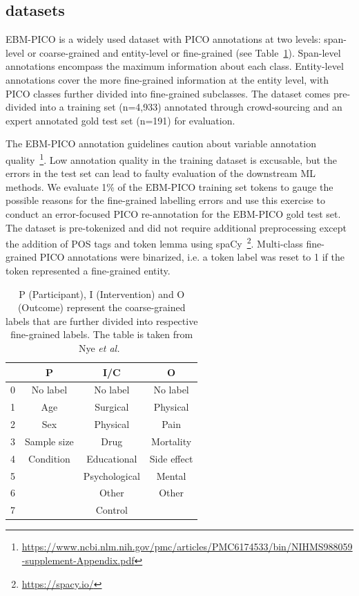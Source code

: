 \documentclass[10.7pt,]{article}
\begin{document}
\subsection{datasets}\label{data}
%
EBM-PICO is a widely used dataset with PICO annotations at two levels: span-level or coarse-grained and entity-level or fine-grained (see Table~\ref{tab:coarsefineconcept}).
Span-level annotations encompass the maximum information about each class.
Entity-level annotations cover the more fine-grained information at the entity level, with PICO classes further divided into fine-grained subclasses.
The dataset comes pre-divided into a training set (n=4,933) annotated through crowd-sourcing and an expert annotated gold test set (n=191) for evaluation.~\cite{nye2018corpus}

The EBM-PICO annotation guidelines caution about variable annotation quality~\footnote{\url{https://www.ncbi.nlm.nih.gov/pmc/articles/PMC6174533/bin/NIHMS988059-supplement-Appendix.pdf}}.
Low annotation quality in the training dataset is excusable, but the errors in the test set can lead to faulty evaluation of the downstream ML methods.
We evaluate 1\% of the EBM-PICO training set tokens to gauge the possible reasons for the fine-grained labelling errors and use this exercise to conduct an error-focused PICO re-annotation for the EBM-PICO gold test set.
The dataset is pre-tokenized and did not require additional preprocessing except the addition of POS tags and token lemma using spaCy~\footnote{\url{https://spacy.io/}}.
Multi-class fine-grained PICO annotations were binarized, i.e. a token label was reset to 1 if the token represented a fine-grained entity.
%
\begin{table}[h!]
\begin{center}
\begin{tabular}{| c | c | c | c |} 
\hline
 & P & I/C & O \\ 
\hline
0 & No label & No label & No label \\ 
1 & Age & Surgical & Physical \\ 
2 & Sex & Physical & Pain \\
3 & Sample size & Drug & Mortality \\
4 & Condition & Educational & Side effect \\
5 &  & Psychological & Mental \\
6 &  & Other & Other \\
7 &  & Control &  \\
\hline
\end{tabular}
\caption{\label{tab:coarsefineconcept} P (Participant), I (Intervention) and O (Outcome) represent the coarse-grained labels that are further divided into respective fine-grained labels. The table is taken from Nye \textit{et al.}~\cite{nye2018corpus}}
\end{center}
\end{table}
%
\end{document}
